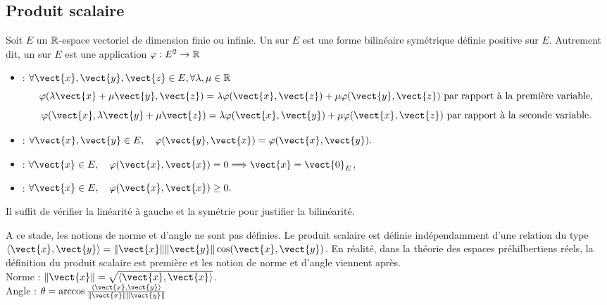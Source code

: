 \documentclass{book}
\begin{document}
\subsection{Produit scalaire}
\begin{Definition}
Soit $E$ un $\mathbb{R}$-espace vectoriel de dimension finie ou infinie.
Un  sur $E$ est une forme bilinéaire symétrique définie positive sur $E$.
Autrement dit, un  sur $E$ est une application $\varphi:E^2\to \mathbb{R}$
\begin{itemize}
\item {} :
  $\forall \vect{x},\vect{y},\vect{z}\in E, \forall \lambda ,\mu \in \R$
  $$ \varphi (\lambda \vect{x}+\mu \vect{y},\vect{z}) = \lambda \varphi (\vect{x},\vect{z}) + \mu \varphi (\vect{y},\vect{z})\text{ par rapport à la première variable}, $$
  $$ \varphi (\vect{x},\lambda \vect{y}+\mu \vect{z}) = \lambda \varphi (\vect{x},\vect{y}) + \mu \varphi (\vect{x},\vect{z})\text{ par rapport à la seconde variable}. $$
\item {} : $\forall \vect{x},\vect{y}\in E, \quad  \varphi (\vect{y},\vect{x}) = \varphi (\vect{x},\vect{y}).$
\item {} : $\forall \vect{x}\in E, \quad \varphi (\vect{x},\vect{x})=0 \Longrightarrow \vect{x} = \vect{0}_E$,
\item {} : $\forall \vect{x}\in E,\quad \varphi (\vect{x},\vect{x})\geq 0.$ 
\end{itemize}
\end{Definition}
Il suffit de vérifier la linéarité à gauche et la symétrie pour justifier la bilinéarité.
\begin{Remarque}
A ce stade, les notions de norme et d'angle ne sont pas définies. Le produit scalaire est définie indépendamment d'une relation du type   $\langle \vect{x}, \vect{y} \rangle = \|\vect{x}\|\|\vect{y}\| \cos(\vect{x}, \vect{y})$. En réalité, dans la théorie des espaces préhilbertiens réels, la définition du produit scalaire est première et les notion de norme et d'angle viennent après.\\
Norme : $\|\vect{x}\|=\sqrt{\langle \vect{x}, \vect{x} \rangle}$.\\
Angle : $\theta=\arccos{\frac{\langle \vect{x}, \vect{y} \rangle}{\|\vect{x}\|\|\vect{y}\| }}$
\begin{center}
\end{center}
\end{Remarque} 
\end{document}
